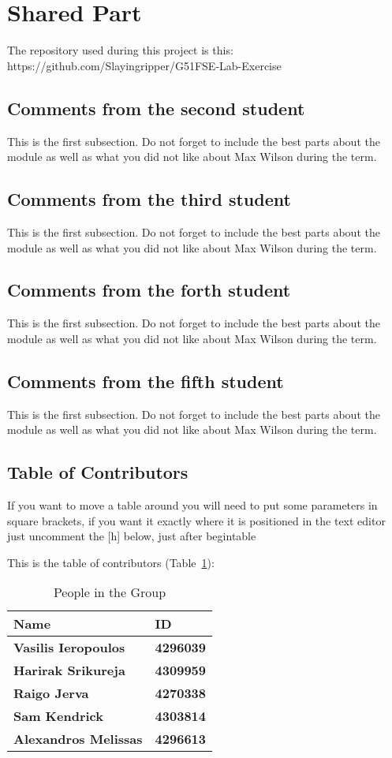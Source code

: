 \section{Shared Part}

The repository used during this project is this: https://github.com/Slayingripper/G51FSE-Lab-Exercise



\subsection{Comments from the second student}
This is the first subsection. Do not forget to include the best parts about the module as well as what you did not like about Max Wilson during the term.

\subsection{Comments from the third student}
This is the first subsection. Do not forget to include the best parts about the module as well as what you did not like about Max Wilson during the term.

\subsection{Comments from the forth student}
This is the first subsection. Do not forget to include the best parts about the module as well as what you did not like about Max Wilson during the term.

\subsection{Comments from the fifth student}
This is the first subsection. Do not forget to include the best parts about the module as well as what you did not like about Max Wilson during the term.

\subsection{Table of Contributors}


If you want to move a table around you will need to put some parameters in square brackets, if you want it exactly where it is positioned in the text editor just uncomment the [h] below, just after begin{table}

This is the table of contributors (Table~\ref{authors}):
\begin{table}%
\centering
\caption{People in the Group}
\label{authors}
\begin{tabular}{|l|l|}
\textbf{Name} & \textbf{ID} \\
\hline
\textbf{Vasilis Ieropoulos} & \textbf{4296039} \\
\hline
\textbf{Harirak Srikureja} & \textbf{4309959} \\
\hline
\textbf{Raigo Jerva} & \textbf{4270338} \\
\hline
\textbf{Sam Kendrick} & \textbf{4303814} \\
\hline
\textbf{Alexandros Melissas} & \textbf{4296613} \\
\hline
\end{tabular}
\end{table}
